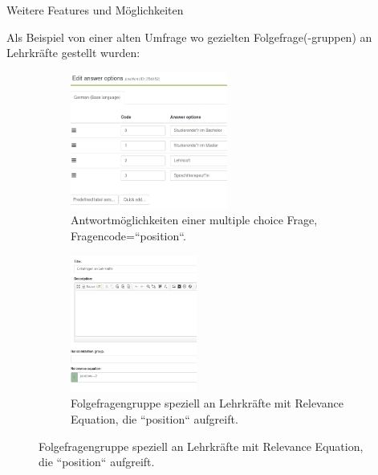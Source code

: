 \documentclass[aspectratio=1610, 9pt]{beamer}
\begin{document}
\begin{frame}
	{Weitere Features und Möglichkeiten}
	\begin{example}
		Als Beispiel von einer alten Umfrage wo gezielten Folgefrage(-gruppen) an
		Lehrkräfte gestellt wurden:
  	  	\begin{figure}
  	  	      \centering
	  	      \begin{subfigure}[b]{0.4\textwidth}
          			\centering
    	  	      		\includegraphics[height=4.5cm]{images/answer-options.png}
				\caption{Antwortmöglichkeiten einer multiple choice Frage,
				Fragencode=``position``.}
	  	      \end{subfigure}
	  	      \begin{subfigure}[b]{0.4\textwidth}
			      \centering
			      \includegraphics[height=4.5cm]{images/extrafragen.png}
			      \caption{Folgefragengruppe speziell an Lehrkräfte mit
			      Relevance Equation, die ``position`` aufgreift.}
	  	      \end{subfigure}
	  	\end{figure}
	\end{example}
\end{frame}
\end{document}
